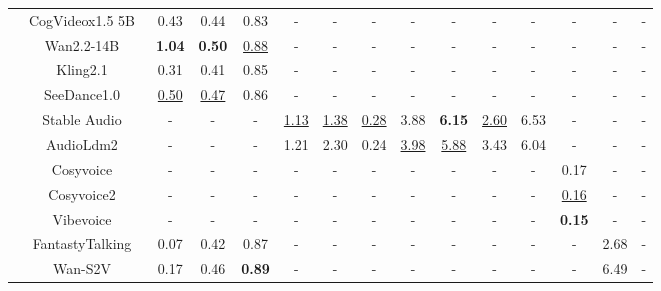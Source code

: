 \begin{table}
{\begin{tabular}{l|c|c|c|c|c|c|c|c|c|c|c|c|c|c}
     & CogVideox1.5 5B~\cite{yang2024cogvideox}         & 0.43 & 0.44 & 0.83 & - & - & - & - & - & - & - & - & - & - \\  
     & Wan2.2-14B~\cite{wan2025wan}                     & \textbf{1.04} & \textbf{0.50} & \underline{0.88} & - & - & - & - & - & - & - & - & - & - \\  
     & Kling2.1~\cite{kuaishou2024kling}                & 0.31 & 0.41 & 0.85 & - & - & - & - & - & - & - & - & - & - \\ 
     & SeeDance1.0~\cite{gao2025seedance}               & \underline{0.50} & \underline{0.47} & 0.86 & - & - & - & - & - & - & - & - & - & - \\
    \midrule
     & Stable Audio~\cite{evans2025stable}              & - & - & - & \underline{1.13} & \underline{1.38} & \underline{0.28} & 3.88 & \textbf{6.15} & \underline{2.60} & 6.53 & - & - & - \\  
     & AudioLdm2~\cite{audioldm2-2024taslp}             & - & - & - & 1.21 & 2.30 & 0.24 & \underline{3.98} & \underline{5.88} & 3.43 & 6.04 & - & - & - \\
    \midrule
     & Cosyvoice~\cite{du2024cosyvoice}                 & - & - & - & - & - & - & - & - & - & - & 0.17 & - & - \\   
     & Cosyvoice2~\cite{du2024cosyvoice2}               & - & - & - & - & - & - & - & - & - & - & \underline{0.16} & - & - \\ 
     & Vibevoice~\cite{peng2025vibevoice}               & - & - & - & - & - & - & - & - & - & - & \textbf{0.15} & - & - \\
    \midrule
     & FantastyTalking~\cite{wang2025fantasytalking}    & 0.07 & 0.42 & 0.87 & - & - & - & - & - & - & - & - & 2.68 & - \\   
     & Wan-S2V~\cite{gao2025wan}                        & 0.17 & 0.46 & \textbf{0.89} & - & - & - & - & - & - & - & - & 6.49 & - \\
    \midrule

\end{tabular}}
\end{table}
